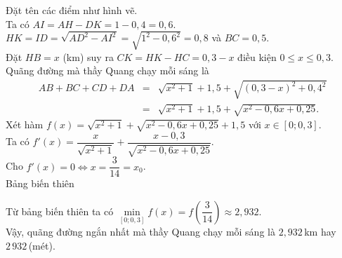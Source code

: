 \begin{ex}
{		Đặt tên các điểm như hình vẽ.\\
		Ta có $AI = AH - DK = 1-0{,}4 = 0{,}6$.\\
		$HK = ID = \sqrt{AD^2 - AI^2} = \sqrt{1^2 -0{,}6^2} = 0{,}8$ và $BC = 0{,}5$.\\
		Đặt $HB = x$ (km) suy ra $CK = HK - HC = 0{,}3-x$ điều kiện $0 \le x \le 0{,}3$.\\
		Quãng đường mà thầy Quang chạy mỗi sáng là
		\allowdisplaybreaks
		\begin{eqnarray*}
			AB + BC + CD + DA &=& \sqrt{x^2 +1} +1{,}5 + \sqrt{(0{,}3-x)^2 +0{,}4^2} \\&=& \sqrt{x^2 +1} +1{,}5+ \sqrt{x^2-0{,}6x+0{,}25}.
		\end{eqnarray*}
		Xét hàm $f (x) = \sqrt{x^2 +1} + \sqrt{x^2 - 0{,}6x+0{,}25} +1{,}5$ với $x \in [0;0{,}3]$.\\
		Ta có $f'(x) = \dfrac{x}{\sqrt{x^2+1}} + \dfrac{x-0{,}3}{\sqrt{x^2-0{,}6x+0{,}25}}$.    \\
		Cho $f'(x)=0 \Leftrightarrow x=\dfrac{3}{14}=x_0$.\\
		Bảng biến thiên
		\begin{center}
		\end{center}
		Từ bảng biến thiên ta có $\min\limits_{[0;0{,}3]} f(x) = f\left(\dfrac{3}{14}\right) \approx 2{,}932$.\\
		Vậy, quãng đường ngắn nhất mà thầy Quang chạy mỗi sáng là $2{,}932$\,km hay $2\,932$\,(mét).
	}
\end{ex}

